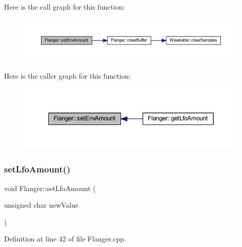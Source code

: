 Here is the call graph for this function\+:
\nopagebreak
\begin{figure}[H]
\begin{center}
\leavevmode
\includegraphics[width=350pt]{d5/d64/class_flanger_ac4f38ebccacae85c724fe43f13caf636_cgraph}
\end{center}
\end{figure}
Here is the caller graph for this function\+:
\nopagebreak
\begin{figure}[H]
\begin{center}
\leavevmode
\includegraphics[width=349pt]{d5/d64/class_flanger_ac4f38ebccacae85c724fe43f13caf636_icgraph}
\end{center}
\end{figure}
\mbox{\label{class_flanger_a311ea2020c379266da75e57bec0cc5ad}} 
\subsubsection{\texorpdfstring{set\+Lfo\+Amount()}{setLfoAmount()}}
{\footnotesize\ttfamily void Flanger\+::set\+Lfo\+Amount (\begin{DoxyParamCaption}\item[{unsigned char}]{new\+Value }\end{DoxyParamCaption})}



Definition at line 42 of file Flanger.\+cpp.

